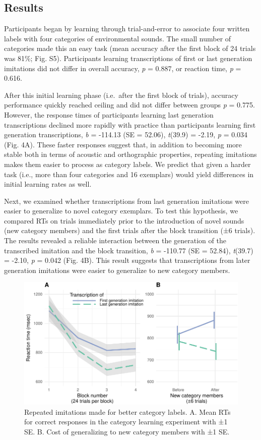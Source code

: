 \documentclass[english,floatsintext,man]{apa6}
\theoremstyle{definition}
\theoremstyle{definition}
\theoremstyle{definition}
\theoremstyle{remark}
\begin{document}
\hypertarget{results-2}{%
\subsection{Results}\label{results-2}}

Participants began by learning through trial-and-error to associate four
written labels with four categories of environmental sounds. The small
number of categories made this an easy task (mean accuracy after the
first block of 24 trials was 81\%; Fig. S5). Participants learning
transcriptions of first or last generation imitations did not differ in
overall accuracy, \emph{p} = 0.887, or reaction time, \emph{p} = 0.616.

After this initial learning phase (i.e.~after the first block of
trials), accuracy performance quickly reached ceiling and did not differ
between groups \emph{p} = 0.775. However, the response times of
participants learning last generation transcriptions declined more
rapidly with practice than participants learning first generation
transcriptions, \emph{b} = -114.13 (SE = 52.06), \emph{t}(39.9) = -2.19,
\emph{p} = 0.034 (Fig. 4A). These faster responses suggest that, in
addition to becoming more stable both in terms of acoustic and
orthographic properties, repeating imitations makes them easier to
process as category labels. We predict that given a harder task (i.e.,
more than four categories and 16 exemplars) would yield differences in
initial learning rates as well.

Next, we examined whether transcriptions from last generation imitations
were easier to generalize to novel category exemplars. To test this
hypothesis, we compared RTs on trials immediately prior to the
introduction of novel sounds (new category members) and the first trials
after the block transition (±6 trials). The results revealed a reliable
interaction between the generation of the transcribed imitation and the
block transition, \emph{b} = -110.77 (SE = 52.84), \emph{t}(39.7) =
-2.10, \emph{p} = 0.042 (Fig. 4B). This result suggests that
transcriptions from later generation imitations were easier to
generalize to new category members.

\begin{figure}
\centering
\includegraphics{fig4-1.pdf}
\caption{\label{fig:fig4}Repeated imitations made for better category
labels. A. Mean RTs for correct responses in the category learning
experiment with ±1 SE. B. Cost of generalizing to new category members
with ±1 SE.}
\end{figure}
\end{document}
